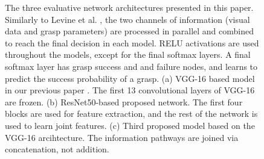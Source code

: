 \begin{figure}[t]
\centering



\caption{The three evaluative network architectures presented in this paper. Similarly to Levine et al. \cite{Levine1}, the two channels of information (visual data and grasp parameters) are processed in parallel and combined to reach the final decision in each model. RELU activations are used throughout the models, except for the final softmax layers. A final softmax layer has grasp success and and failure nodes, and learns to predict the success probability of a grasp. (a) VGG-16 based model in our previous paper \cite{icra}. The first 13 convolutional layers of VGG-16 are frozen. (b) ResNet50-based \cite{resnet} proposed network. The first four blocks are used for feature extraction, and the rest of the network is used to learn joint features. (c) Third proposed model based on the VGG-16 arcihtecture. The information pathways are joined via concatenation, not addition.}

\label{fig:networkArchitecture2}
\end{figure}

